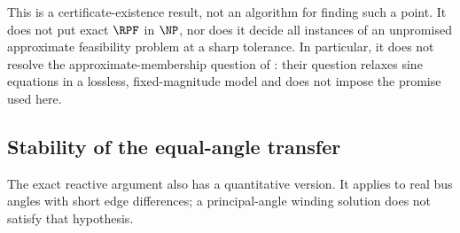 This is a certificate-existence result, not an algorithm for finding such
a point. It does not put exact $\RPF$ in $\NP$, nor does it decide all
instances of an unpromised approximate feasibility problem at a sharp
tolerance. In particular, it does not resolve the approximate-membership
question of \citet[Section 1.3]{BienstockVermaPreprint2019}:
their question relaxes sine equations in a lossless, fixed-magnitude model
and does not impose the promise used here.

\subsection{Stability of the equal-angle transfer}

The exact reactive argument also has a quantitative version. It applies to
real bus angles with short edge differences; a principal-angle winding
solution does not satisfy that hypothesis.

